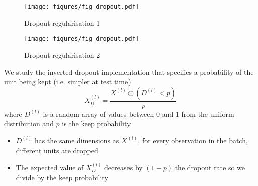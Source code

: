 \documentclass[c]{beamer}
\begin{document}
\begin{frame}{\secsubname}
	\begin{figure}
		\begin{minipage}{.69\textwidth}
			\texttt{[image: figures/fig\_dropout.pdf]}
		\end{minipage}
		\hfill
		\begin{minipage}{.29\textwidth}
			\caption{Dropout regularisation 1}
		\end{minipage}
	\end{figure}
\end{frame}

\begin{frame}{\secsubname}
	\begin{figure}
		\begin{minipage}{.69\textwidth}
			\texttt{[image: figures/fig\_dropout.pdf]}
		\end{minipage}
		\hfill
		\begin{minipage}{.29\textwidth}
			\caption{Dropout regularisation 2}
		\end{minipage}
	\end{figure}
\end{frame}

\begin{frame}{\secsubname}
	We study the inverted dropout implementation that specifies a probability of the unit being kept (i.e. simpler at test time)
	\begin{equation}
		X_D^{(l)} = \frac{X^{(l)} \odot \left(D^{(l)} < p\right)}{p}
	\end{equation}
	where $D^{(l)}$ is a random array of values between 0 and 1 from the uniform distribution and $p$ is the keep probability
	\begin{itemize}
		\item $D^{(l)}$ has the same dimensions as $X^{(l)}$, for every observation in the batch, different units are dropped
		\item The expected value of $X_D^{(l)}$ decreases by $(1-p)$ the dropout rate so we divide by the keep probability
	\end{itemize}
\end{frame}
\end{document}
